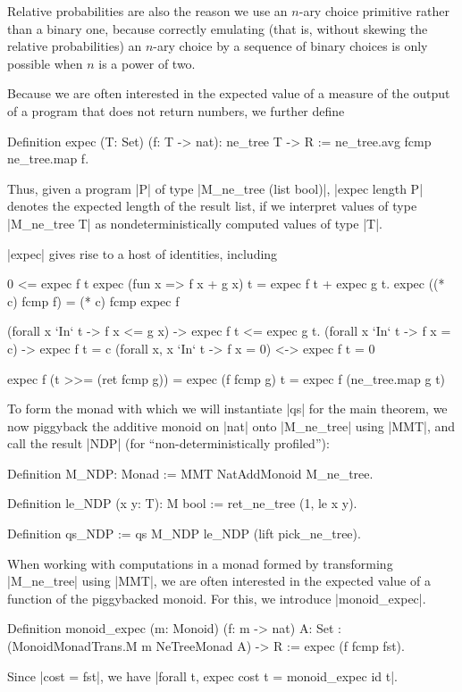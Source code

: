\documentclass[runningheads]{llncs}
\begin{document}
Relative probabilities are also the reason we use an $n$-ary choice primitive rather than a binary one, because correctly emulating (that is, without skewing the relative probabilities) an $n$-ary choice by a sequence of binary choices is only possible when $n$ is a power of two.

Because we are often interested in the expected value of a measure of the output of a program that does not return numbers, we further define

\begin{code}
  Definition expec (T: Set) (f: T -> nat): ne_tree T -> R
    := ne_tree.avg fcmp ne_tree.map f.
\end{code}

Thus, given a program |P| of type |M_ne_tree (list bool)|, |expec length P| denotes the expected length of the result list, if we interpret values of type |M_ne_tree T| as nondeterministically computed values of type |T|.

|expec| gives rise to a host of identities, including

\begin{code}
  0 <= expec f t
  expec (fun x => f x + g x) t = expec f t + expec g t.
  expec ((* c) fcmp f) = (* c) fcmp expec f

  (forall x `In` t -> f x <= g x) -> expec f t <= expec g t.
  (forall x `In` t -> f x = c) -> expec f t = c
  (forall x, x `In` t -> f x = 0) <-> expec f t = 0

  expec f (t >>= (ret fcmp g)) = expec (f fcmp g) t = expec f (ne_tree.map g t)
\end{code}

To form the monad with which we will instantiate |qs| for the main theorem, we now piggyback the additive monoid on |nat| onto |M_ne_tree| using |MMT|, and call the result |NDP| (for ``non-deterministically profiled''):
\begin{code}
  Definition M_NDP: Monad := MMT NatAddMonoid M_ne_tree.

  Definition le_NDP (x y: T): M bool := ret_ne_tree (1, le x y).

  Definition qs_NDP := qs M_NDP le_NDP (lift pick_ne_tree).
\end{code}

When working with computations in a monad formed by transforming |M_ne_tree| using |MMT|, we are often interested in the expected value of a function of the piggybacked monoid. For this, we introduce |monoid_expec|.
\begin{code}
  Definition monoid_expec (m: Monoid) (f: m -> nat) {A: Set}
    : (MonoidMonadTrans.M m NeTreeMonad A) -> R := expec (f fcmp fst).
\end{code}
Since |cost = fst|, we have |forall t, expec cost t = monoid_expec id t|.
\end{document}
